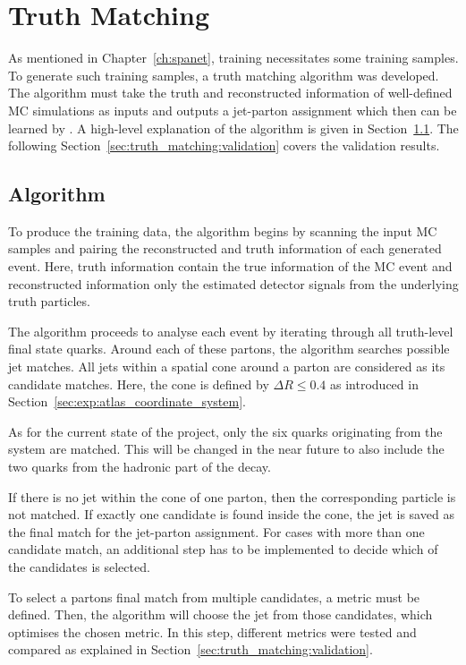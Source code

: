 \documentclass[bachelor,ngerman,english]{GAUBM}
\begin{document}
\chapter{Truth Matching}
\label{ch:truth_matching}
As mentioned in Chapter~\ref{ch:spanet}, training \spanet necessitates some training samples. To generate such training samples, a truth matching algorithm was developed. The algorithm must take the truth and reconstructed information of well-defined MC simulations as inputs and outputs a jet-parton assignment which then can be learned by \spanet. A high-level explanation of the algorithm is given in Section~\ref{sec:truth_matching:algorithm}. The following Section~\ref{sec:truth_matching:validation} covers the validation results. 

\section{Algorithm}
\label{sec:truth_matching:algorithm}
To produce the training data, the algorithm begins by scanning the input MC samples and pairing the reconstructed and truth information of each generated event. Here, truth information contain the true information of the MC event and reconstructed information only the estimated detector signals from the underlying truth particles. 

The algorithm proceeds to analyse each event by iterating through all truth-level final state quarks. Around each of these partons, the algorithm searches possible jet matches. All jets within a spatial cone around a parton are considered as its candidate matches. Here, the cone is defined by $\Delta R\leq0.4$ as introduced in Section~\ref{sec:exp:atlas_coordinate_system}.

As for the current state of the project, only the six quarks originating from the \ttbar system are matched. This will be changed in the near future to also include the two quarks from the hadronic part of the \HWW decay.

If there is no jet within the cone of one parton, then the corresponding particle is not matched. If exactly one candidate is found inside the cone, the jet is saved as the final match for the jet-parton assignment. For cases with more than one candidate match, an additional step has to be implemented to decide which of the candidates is selected.

To select a partons final match from multiple candidates, a metric must be defined. Then, the algorithm will choose the jet from those candidates, which optimises the chosen metric. In this step, different metrics were tested and compared as explained in Section~\ref{sec:truth_matching:validation}. 
\end{document}
